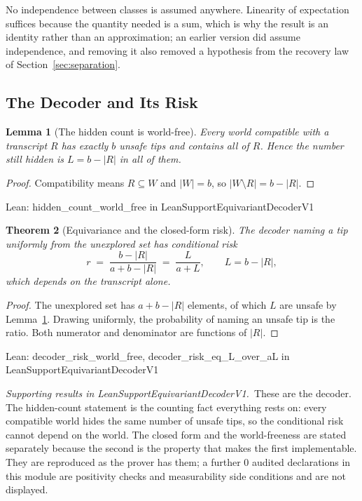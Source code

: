 \documentclass[conference]{IEEEtran}
\newtheorem{theorem}{Theorem}
\newtheorem{lemma}[theorem]{Lemma}
\theoremstyle{definition}
\newcommand{\lean}[1]{\textsf{\footnotesize #1}}
\newcommand{\leanbox}[1]{%
  \par\vspace{2pt}\noindent
  {\footnotesize\textsf{Lean: #1}}\par\vspace{2pt}}
\begin{document}
No independence between classes is assumed anywhere. Linearity of expectation suffices because
the quantity needed is a sum, which is why the result is an identity rather than an
approximation; an earlier version did assume independence, and removing it also removed a
hypothesis from the recovery law of Section~\ref{sec:separation}.

\subsection{The Decoder and Its Risk}
\label{sec:decoder}

\begin{lemma}[The hidden count is world-free]
\label{lem:hidden}
Every world compatible with a transcript $R$ has exactly $b$ unsafe tips and contains all of
$R$. Hence the number still hidden is $L=b-|R|$ in all of them.
\end{lemma}

\begin{proof}
Compatibility means $R\subseteq W$ and $|W|=b$, so $|W\setminus R|=b-|R|$.
\end{proof}

\leanbox{\lean{hidden\_count\_world\_free} in \lean{LeanSupportEquivariantDecoderV1}}

\begin{theorem}[Equivariance and the closed-form risk]
\label{thm:equivariant}
The decoder naming a tip uniformly from the unexplored set has conditional risk
\begin{equation}
r\;=\;\frac{b-|R|}{a+b-|R|}\;=\;\frac{L}{a+L},
\qquad L=b-|R|,
\label{eq:decoder}
\end{equation}
which depends on the transcript alone.
\end{theorem}

\begin{proof}
The unexplored set has $a+b-|R|$ elements, of which $L$ are unsafe by
Lemma~\ref{lem:hidden}. Drawing uniformly, the probability of naming an unsafe tip is the
ratio. Both numerator and denominator are functions of $|R|$.
\end{proof}

\leanbox{\lean{decoder\_risk\_world\_free}, \lean{decoder\_risk\_eq\_L\_over\_aL} in
\lean{LeanSupportEquivariantDecoderV1}}

\noindent\emph{Supporting results in \lean{LeanSupportEquivariantDecoderV1}.}~These are the decoder. The hidden-count statement is the counting fact everything rests on: every compatible world hides the same number of unsafe tips, so the conditional risk cannot depend on the world. The closed form and the world-freeness are stated separately because the second is the property that makes the first implementable. They are reproduced as the prover has them; a further $0$ audited declarations in this module are positivity checks and measurability side conditions and are not displayed.
\end{document}
